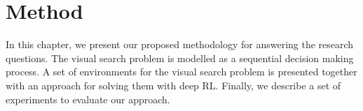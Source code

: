 \chapter{Method}
\label{cha:method}

In this chapter, we present our proposed methodology for answering the research questions.
The visual search problem is modelled as a sequential decision making process.
A set of environments for the visual search problem is presented together with an approach for solving them with deep RL.
Finally, we describe a set of experiments to evaluate our approach.





